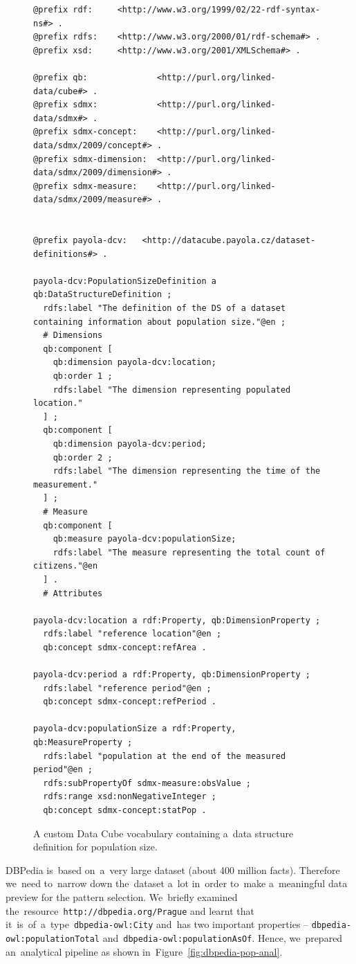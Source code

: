 \begin{figure}
  \scriptsize
  \begin{verbatim}
@prefix rdf:     <http://www.w3.org/1999/02/22-rdf-syntax-ns#> .
@prefix rdfs:    <http://www.w3.org/2000/01/rdf-schema#> .
@prefix xsd:     <http://www.w3.org/2001/XMLSchema#> .

@prefix qb:              <http://purl.org/linked-data/cube#> .
@prefix sdmx:            <http://purl.org/linked-data/sdmx#> .
@prefix sdmx-concept:    <http://purl.org/linked-data/sdmx/2009/concept#> .
@prefix sdmx-dimension:  <http://purl.org/linked-data/sdmx/2009/dimension#> .
@prefix sdmx-measure:    <http://purl.org/linked-data/sdmx/2009/measure#> .


@prefix payola-dcv:   <http://datacube.payola.cz/dataset-definitions#> .

payola-dcv:PopulationSizeDefinition a qb:DataStructureDefinition ;
  rdfs:label "The definition of the DS of a dataset containing information about population size."@en ;
  # Dimensions
  qb:component [
    qb:dimension payola-dcv:location;
    qb:order 1 ;
    rdfs:label "The dimension representing populated location."
  ] ;
  qb:component [	
    qb:dimension payola-dcv:period;
    qb:order 2 ;
    rdfs:label "The dimension representing the time of the measurement."
  ] ;
  # Measure
  qb:component [
    qb:measure payola-dcv:populationSize;
    rdfs:label "The measure representing the total count of citizens."@en
  ] .
  # Attributes

payola-dcv:location a rdf:Property, qb:DimensionProperty ;
  rdfs:label "reference location"@en ;
  qb:concept sdmx-concept:refArea .

payola-dcv:period a rdf:Property, qb:DimensionProperty ;
  rdfs:label "reference period"@en ;
  qb:concept sdmx-concept:refPeriod .

payola-dcv:populationSize a rdf:Property, qb:MeasureProperty ;
  rdfs:label "population at the end of the measured period"@en ;
  rdfs:subPropertyOf sdmx-measure:obsValue ;
  rdfs:range xsd:nonNegativeInteger ;
  qb:concept sdmx-concept:statPop .
  \end{verbatim}
  \caption{A custom Data Cube vocabulary containing a~data structure definition for population size.}
  \label{fig:dcv-dbpedia-dsd}
\end{figure}

\begin{sloppypar}
DBPedia is~based on~a~very large dataset (about 400 million facts). Therefore we~need to~narrow down the~dataset a~lot in~order to~make a~meaningful data preview for 
the
pattern selection. We~briefly examined the~resource~\texttt{http://dbpedia.org/Prague} 
and learnt that it~is~of~a~type~\texttt{dbpedia-owl:City} and~has two 
important properties -- \texttt{dbpedia-owl:populationTotal} and~\texttt{dbpedia-owl:populationAsOf}. Hence, we~prepared an~analytical pipeline 
as shown in~Figure~\ref{fig:dbpedia-pop-anal}.
\end{sloppypar}

